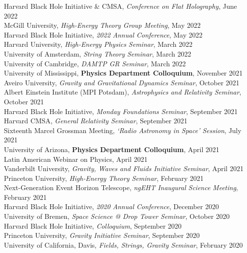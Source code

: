 \documentclass[margin,line]{resume}
\begin{document}
\begin{resume}
Harvard Black Hole Initiative \& CMSA, \textit{Conference on Flat Holography}, June 2022 \\
McGill University, \textit{High-Energy Theory Group Meeting}, May 2022 \\
Harvard Black Hole Initiative, \textit{2022 Annual Conference}, May 2022 \\
Harvard University, \textit{High-Energy Physics Seminar}, March 2022 \\
University of Amsterdam, \textit{String Theory Seminar}, March 2022 \\
University of Cambridge, \textit{DAMTP GR Seminar}, March 2022 \\
University of Mississippi, \textbf{Physics Department Colloquium}, November 2021 \\
Aveiro University, \textit{Gravity and Gravitational Dynamics Seminar}, October 2021 \\
Albert Einstein Institute (MPI Potsdam), \textit{Astrophysics and Relativity Seminar}, October 2021 \\
Harvard Black Hole Initiative, \textit{Monday Foundations Seminar}, September 2021 \\
Harvard CMSA, \textit{General Relativity Seminar}, September 2021 \\
Sixteenth Marcel Grossman Meeting, \textit{`Radio Astronomy in Space' Session}, July 2021 \\
University of Arizona, \textbf{Physics Department Colloquium}, April 2021 \\
Latin American Webinar on Physics, April 2021 \\
Vanderbilt University, \textit{Gravity, Waves and Fluids Initiative Seminar}, April 2021 \\
Princeton University, \textit{High-Energy Theory Seminar}, February 2021 \\
Next-Generation Event Horizon Telescope, \textit{ngEHT Inaugural Science Meeting}, February 2021 \\
Harvard Black Hole Initiative, \textit{2020 Annual Conference}, December 2020 \\
University of Bremen, \textit{Space Science @ Drop Tower Seminar}, October 2020 \\
Harvard Black Hole Initiative, \textit{Colloquium}, September 2020 \\
Princeton University, \textit{Gravity Initiative Seminar}, September 2020 \\
University of California, Davis, \textit{Fields, Strings, Gravity Seminar}, February 2020 \\

\end{resume}
\end{document}
